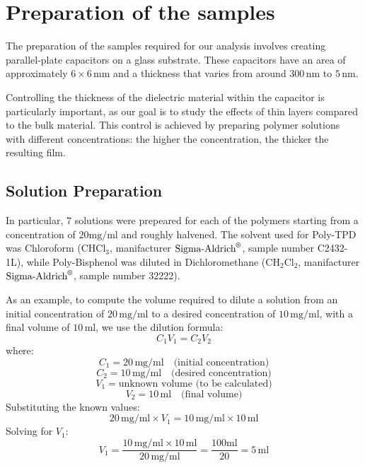 %
\section{Preparation of the samples}

The preparation of the samples required for our analysis involves creating parallel-plate capacitors on a glass substrate. These capacitors have an area of approximately \( 6 \times 6 \, \text{mm} \) and a thickness that varies from around \( 300 \, \text{nm} \) to \( 5 \, \text{nm} \).

Controlling the thickness of the dielectric material %
within the capacitor is particularly important, as our goal is to study the effects of thin layers compared to the bulk material. This control is achieved by preparing polymer solutions with different concentrations: the higher the concentration, the thicker the resulting film.
\subsection{Solution Preparation}

In particular, 7 solutions were prepeared for each of the polymers starting from a concentration of $20 \text{mg/ml}$ %
and roughly halvened.
The solvent used for Poly-TPD was Chloroform ($\text{CHCl}_3$, manifacturer $\text{Sigma-Aldrich}^{\text{\textregistered}}$, sample number C2432-1L), while Poly-Bisphenol was diluted in Dichloromethane ($\text{CH}_2\text{Cl}_2$, manifacturer $\text{Sigma-Aldrich}^{\text{\textregistered}}$, sample number 32222).

As an example, to compute the volume required to dilute a solution from an initial concentration of \( 20 \, \text{mg/ml} \) to a desired concentration of \( 10 \, \text{mg/ml} \), with a final volume of \( 10 \, \text{ml} \), we use the dilution formula:
\[
C_1 V_1 = C_2 V_2
\]
where:
\[
C_1 = 20 \, \text{mg/ml} \quad \text{(initial concentration)}
\]
\[
C_2 = 10 \, \text{mg/ml} \quad \text{(desired concentration)}
\]
\[
V_1 = \text{unknown volume (to be calculated)}
\]
\[
V_2 = 10 \, \text{ml} \quad \text{(final volume)}
\]
Substituting the known values:
\[
20 \, \text{mg/ml} \times V_1 = 10 \, \text{mg/ml} \times 10 \, \text{ml}
\]
Solving for \( V_1 \):
\[
	V_1 = \frac{10 \, \text{mg/ml} \times 10 \, \text{ml}}{20 \, \text{mg/ml}} = \frac{100 \text{ml}}{20} = 5 \, \text{ml}
\]

